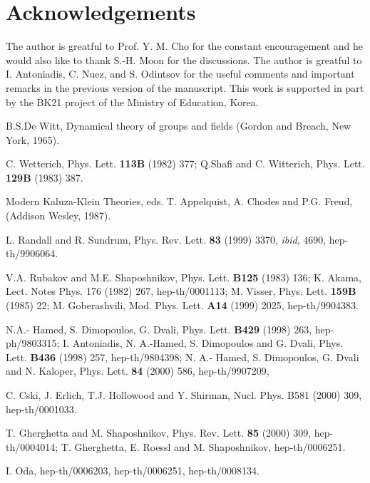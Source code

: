 \documentclass[a4paper,12pt]{article}
\begin{document}
\section*{Acknowledgements}
The author is greatful to Prof. Y. M. Cho for the constant 
encouragement and he would also like to thank S.-H. Moon for the 
discussions. The author is greatful to I. Antoniadis, C. Nu\coordHE{}ez, 
and S. Odintsov for the useful comments and important remarks in the 
previous version of the manuscript. This work is supported in part by the 
BK21 project of the Ministry of Education, Korea.
\begin{thebibliography}{99}
 B.S.De Witt, Dynamical theory of groups and fields 
(Gordon and Breach, New York, 1965). 

 C. Wetterich, Phys. Lett. {\bf 113B} (1982) 377; Q.Shafi 
and C. Witterich, Phys. Lett. {\bf 129B} (1983) 387.  

 Modern Kaluza-Klein Theories, eds. T. Appelquist, 
A. Chodes and P.G. Freud, (Addison Wesley, 1987).

 L. Randall and R. Sundrum, Phys. Rev. Lett. {\bf 83} (1999) 
3370, {\it ibid}, 4690, hep-th/9906064.

 V.A. Rubakov and M.E. Shaposhnikov, Phys. Lett. {\bf B125} 
(1983) 136; K. Akama, Lect. Notes Phys. 176 (1982) 267, hep-th/0001113; 
M. Visser, Phys. Lett. {\bf 159B} (1985) 22; M. Goberashvili, 
Mod. Phys. Lett. {\bf A14} (1999) 2025, hep-th/9904383.

 N.A.- Hamed, S. Dimopoulos, G. Dvali, Phys. Lett. {\bf B429} 
(1998) 263, hep-ph/9803315; I. Antoniadis, N. A.-Hamed, S. Dimopoulos and 
G. Dvali, Phys. Lett. {\bf B436} (1998) 257, hep-th/9804398; N. A.- Hamed, 
S. Dimopoulos, G. Dvali and N. Kaloper, Phys. Lett. {\bf 84} (2000) 586, 
hep-th/9907209, 

  C. Cs\coordHE{}ki, J. Erlich, T.J. Hollowood and Y. Shirman, 
Nucl. Phys. {B581} (2000) 309, hep-th/0001033.

 T. Gherghetta and M. Shaposhnikov, Phys. Rev. Lett. {\bf 85} 
(2000) 309, hep-th/0004014; T. Gherghetta, E. Roessl and M. Shaposhnikov, 
hep-th/0006251.  

 I. Oda, hep-th/0006203, hep-th/0006251, hep-th/0008134.


\end{thebibliography}
\end{document}
